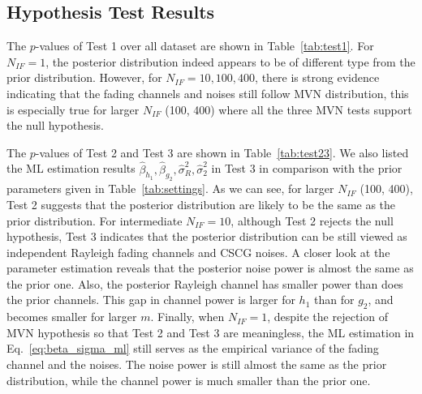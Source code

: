 \documentclass[journal,draftcls,onecolumn,12pt,twoside]{IEEEtran}
\begin{document}
\subsection{Hypothesis Test Results}
The $p$-values of Test 1 over all dataset are shown in Table~\ref{tab:test1}.
For $N_{IF} = 1$, the posterior distribution indeed appears to be of different
type from the prior distribution. However, for $N_{IF} = 10, 100, 400$, there is
strong evidence indicating that the fading channels and noises still follow MVN
distribution, this is especially true for larger $N_{IF}$ (100, 400) where all
the three MVN tests support the null hypothesis.

The $p$-values of Test 2 and Test 3 are shown in Table~\ref{tab:test23}. We
also listed the ML estimation results $\hat{\beta}_{h_1}, \hat{\beta}_{g_2},
\hat{\sigma}^2_{R}, \hat{\sigma}^2_{2}$ in Test 3 in comparison with the prior
parameters given in Table~\ref{tab:settings}. As we can see, for larger $N_{IF}$
 (100, 400), Test 2 suggests that the posterior distribution are likely to be
the same as the prior distribution. For intermediate $N_{IF} = 10$, although
Test 2 rejects the null hypothesis, Test 3 indicates that the posterior
distribution can be still viewed as independent Rayleigh fading channels and
CSCG noises. A closer look at the parameter estimation reveals that 
the posterior noise power is almost the same as the prior one. Also, the
posterior Rayleigh channel has smaller power than does the prior channels. This
gap in channel power is larger for $h_1$ than for $g_2$, and becomes smaller for
larger $m$. Finally, when $N_{IF} = 1$, despite the rejection of MVN hypothesis
so that Test 2 and Test 3 are meaningless, the ML estimation in
Eq.~\eqref{eq:beta_sigma_ml} still serves as the empirical variance of the
fading channel and the noises. The noise power is still almost the same as the
prior distribution, while the channel power is much smaller than the prior one.
\end{document}
